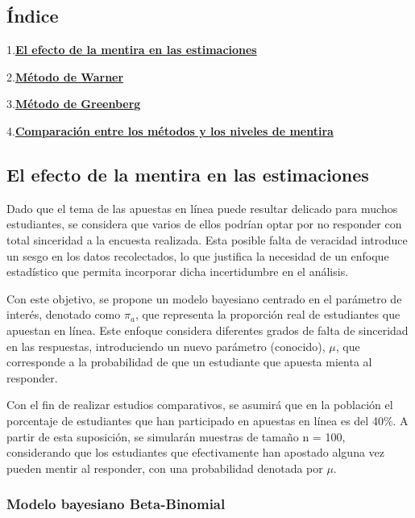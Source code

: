 \documentclass[
]{article}
\begin{document}
\newpage

\subsection{Índice}\label{uxedndice}

1.\hyperref[Objetivo-1]{\textbf{El efecto de la mentira en las estimaciones}}

2.\hyperref[Objetivo-2]{\textbf{Método de Warner}}

3.\hyperref[Objetivo-3]{\textbf{Método de Greenberg}}

4.\hyperref[Objetivo-4]{\textbf{Comparación entre los métodos y los niveles de mentira}}

\newpage

\subsection{El efecto de la mentira en las estimaciones}\label{Objetivo-1}

Dado que el tema de las apuestas en línea puede resultar delicado para muchos estudiantes, se considera que varios de ellos podrían optar por no responder con total sinceridad a la encuesta realizada. Esta posible falta de veracidad introduce un sesgo en los datos recolectados, lo que justifica la necesidad de un enfoque estadístico que permita incorporar dicha incertidumbre en el análisis.

Con este objetivo, se propone un modelo bayesiano centrado en el parámetro de interés, denotado como \(\pi_a\), que representa la proporción real de estudiantes que apuestan en línea. Este enfoque considera diferentes grados de falta de sinceridad en las respuestas, introduciendo un nuevo parámetro (conocido), \(\mu\), que corresponde a la probabilidad de que un estudiante que apuesta mienta al responder.

Con el fin de realizar estudios comparativos, se asumirá que en la población el porcentaje de estudiantes que han participado en apuestas en línea es del 40\%. A partir de esta suposición, se simularán muestras de tamaño n = 100, considerando que los estudiantes que efectivamente han apostado alguna vez pueden mentir al responder, con una probabilidad denotada por \(\mu\).

\subsubsection{Modelo bayesiano Beta-Binomial}\label{subtitulo-1}
\end{document}
